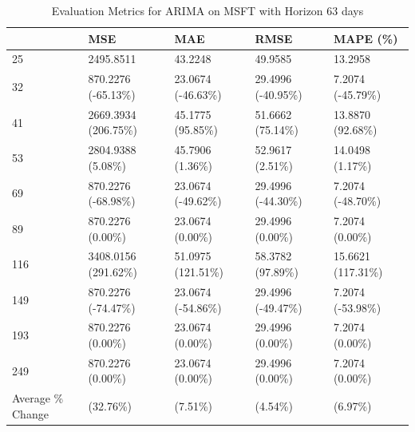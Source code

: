 \begin{table}
\caption{Evaluation Metrics for ARIMA on MSFT with Horizon 63 days}
\label{tab:arima_MSFT_h63_metrics}
\begin{tabular}{lllll}
\toprule
 & MSE & MAE & RMSE & MAPE (\%) \\
\midrule
25 & 2495.8511 & 43.2248 & 49.9585 & 13.2958 \\
32 & 870.2276 (-65.13\%) & 23.0674 (-46.63\%) & 29.4996 (-40.95\%) & 7.2074 (-45.79\%) \\
41 & 2669.3934 (206.75\%) & 45.1775 (95.85\%) & 51.6662 (75.14\%) & 13.8870 (92.68\%) \\
53 & 2804.9388 (5.08\%) & 45.7906 (1.36\%) & 52.9617 (2.51\%) & 14.0498 (1.17\%) \\
69 & 870.2276 (-68.98\%) & 23.0674 (-49.62\%) & 29.4996 (-44.30\%) & 7.2074 (-48.70\%) \\
89 & 870.2276 (0.00\%) & 23.0674 (0.00\%) & 29.4996 (0.00\%) & 7.2074 (0.00\%) \\
116 & 3408.0156 (291.62\%) & 51.0975 (121.51\%) & 58.3782 (97.89\%) & 15.6621 (117.31\%) \\
149 & 870.2276 (-74.47\%) & 23.0674 (-54.86\%) & 29.4996 (-49.47\%) & 7.2074 (-53.98\%) \\
193 & 870.2276 (0.00\%) & 23.0674 (0.00\%) & 29.4996 (0.00\%) & 7.2074 (0.00\%) \\
249 & 870.2276 (0.00\%) & 23.0674 (0.00\%) & 29.4996 (0.00\%) & 7.2074 (0.00\%) \\
Average \% Change & (32.76\%) & (7.51\%) & (4.54\%) & (6.97\%) \\
\bottomrule
\end{tabular}
\end{table}
